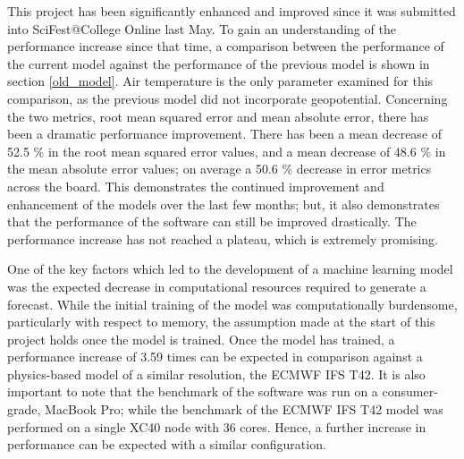 This project has been significantly enhanced and improved since it was submitted into SciFest@College Online last May. To gain an understanding of the performance increase since that time, a comparison between the performance of the current model against the performance of the previous model is shown in section \ref{old_model}. Air temperature is the only parameter examined for this comparison, as the previous model did not incorporate geopotential. Concerning the two metrics, root mean squared error and mean absolute error, there has been a dramatic performance improvement. There has been a mean decrease of 52.5 \% in the root mean squared error values, and a mean decrease of 48.6 \% in the mean absolute error values; on average a 50.6 \% decrease in error metrics across the board. This demonstrates the continued improvement and enhancement of the models over the last few months; but, it also demonstrates that the performance of the software can still be improved drastically. The performance increase has not reached a plateau, which is extremely promising.

One of the key factors which led to the development of a machine learning model was the expected decrease in computational resources required to generate a forecast. While the initial training of the model was computationally burdensome, particularly with respect to memory, the assumption made at the start of this project holds once the model is trained. Once the model has trained, a performance increase of 3.59 times can be expected in comparison against a physics-based model of a similar resolution, the ECMWF IFS T42. It is also important to note that the benchmark of the software was run on a consumer-grade, MacBook Pro; while the benchmark of the ECMWF IFS T42 model was performed on a single XC40 node with 36 cores. Hence, a further increase in performance can be expected with a similar configuration.

